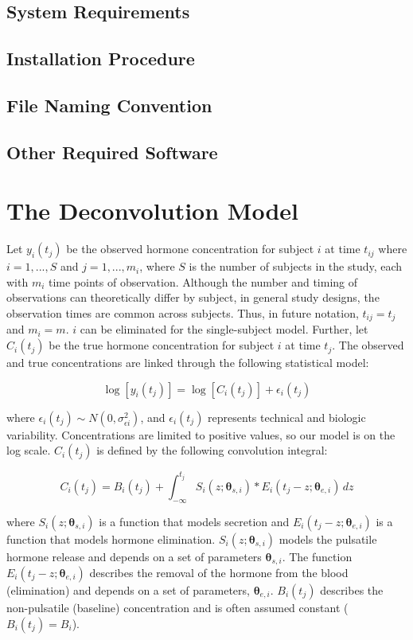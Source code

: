 \documentclass[11pt]{book}
\begin{document}
\section{System Requirements}
\section{Installation Procedure}
\section{File Naming Convention}
\section{Other Required Software}
\chapter{The Deconvolution Model}
Let $y_i(t_{j})$ be the observed hormone concentration for subject $i$ at time $t_{ij}$ where $i = 1,...,S$ and $j=1,...,m_i$, where $S$ is the number of subjects in the study, each with $m_i$ time points of observation. Although the number and timing of observations can theoretically differ by subject, in general study designs, the observation times are common across subjects. Thus, in future notation, $t_{ij} = t_j$ and $m_i = m$. $i$ can be eliminated for the single-subject model.
Further, let $C_i(t_j)$ be the true hormone concentration for subject $i$ at time $t_j$. The observed and true concentrations are linked through the following statistical model:


$$
\log[y_i(t_j)]=\log[C_i(t_j)]+\epsilon_i(t_j)
$$


\noindent where $\epsilon_i(t_j) \sim N(0,\sigma^2_{\epsilon i})$, and $\epsilon_i(t_j)$ represents technical and biologic variability. Concentrations are limited to positive values, so our model is on the log scale. $C_i(t_j)$ is defined by the following convolution integral:


$$
C_i(t_j) = B_i(t_j) + \int_{-\infty}^{t_j} S_i(z;\boldsymbol{\theta}_{s,i})*E_i(t_j - z;\boldsymbol{\theta}_{e,i})\,dz
$$


\noindent where $S_i(z;\boldsymbol{\theta}_{s,i})$ is a function that models secretion and $E_i(t_j-z;\boldsymbol{\theta}_{e,i})$ is a function that models hormone elimination. $S_i(z;\boldsymbol{\theta}_{s,i})$ models the pulsatile hormone release and depends on a set of parameters $\boldsymbol{\theta}_{s,i}$. The function $E_i(t_j - z;\boldsymbol{\theta}_{e,i})$ describes the removal of the hormone from the blood (elimination) and depends on a set of parameters, $\boldsymbol{\theta}_{e,i}$. $B_i(t_j)$ describes the non-pulsatile (baseline) concentration and is often assumed constant ($B_i(t_j) = B_i$).
\end{document}
